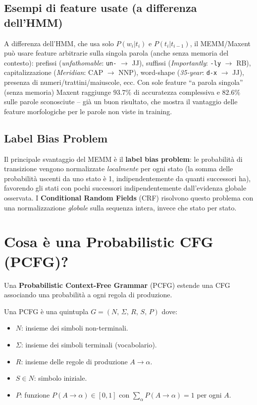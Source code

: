 \documentclass[12pt,a4paper]{article}
\begin{document}
\subsection{Esempi di feature usate (a differenza dell'HMM)}

A differenza dell'HMM, che usa solo $P(w_i|t_i)$ e $P(t_i|t_{i-1})$, il MEMM/Maxent può usare feature arbitrarie sulla singola parola (anche senza memoria del contesto): prefissi (\textit{unfathomable}: \texttt{un-} $\to$ JJ), suffissi (\textit{Importantly}: \texttt{-ly} $\to$ RB), capitalizzazione (\textit{Meridian}: CAP $\to$ NNP), word-shape (\textit{35-year}: \texttt{d-x} $\to$ JJ), presenza di numeri/trattini/maiuscole, ecc. Con sole feature ``a parola singola'' (senza memoria) Maxent raggiunge $93.7\%$ di accuratezza complessiva e $82.6\%$ sulle parole sconosciute -- già un buon risultato, che mostra il vantaggio delle feature morfologiche per le parole non viste in training.

\subsection{Label Bias Problem}

Il principale svantaggio del MEMM è il \textbf{label bias problem}: le probabilità di transizione vengono normalizzate \emph{localmente} per ogni stato (la somma delle probabilità uscenti da uno stato è 1, indipendentemente da quanti successori ha), favorendo gli stati con pochi successori indipendentemente dall'evidenza globale osservata. I \textbf{Conditional Random Fields} (CRF) risolvono questo problema con una normalizzazione \emph{globale} sulla sequenza intera, invece che stato per stato.

\section{Cosa è una Probabilistic CFG (PCFG)?}

Una \textbf{Probabilistic Context-Free Grammar} (PCFG) estende una CFG associando una probabilità a ogni regola di produzione.

\begin{defbox}
Una PCFG è una quintupla $G = (N,\,\Sigma,\,R,\,S,\,P)$ dove:
\begin{itemize}[leftmargin=1.5em]
  \item $N$: insieme dei simboli non-terminali.
  \item $\Sigma$: insieme dei simboli terminali (vocabolario).
  \item $R$: insieme delle regole di produzione $A \to \alpha$.
  \item $S \in N$: simbolo iniziale.
  \item $P$: funzione $P(A \to \alpha) \in [0,1]$ con $\displaystyle\sum_{\alpha} P(A \to \alpha) = 1$ per ogni $A$.
\end{itemize}
\end{defbox}
\end{document}
